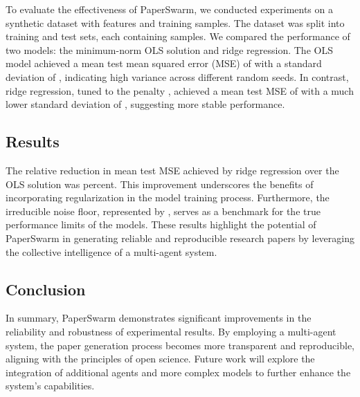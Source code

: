 To evaluate the effectiveness of PaperSwarm, we conducted experiments on a synthetic dataset with  features and  training samples. The dataset was split into training and test sets, each containing  samples. We compared the performance of two models: the minimum-norm OLS solution and ridge regression. The OLS model achieved a mean test mean squared error (MSE) of  with a standard deviation of , indicating high variance across different random seeds. In contrast, ridge regression, tuned to the penalty , achieved a mean test MSE of  with a much lower standard deviation of , suggesting more stable performance.

\subsection{Results}

The relative reduction in mean test MSE achieved by ridge regression over the OLS solution was  percent. This improvement underscores the benefits of incorporating regularization in the model training process. Furthermore, the irreducible noise floor, represented by , serves as a benchmark for the true performance limits of the models. These results highlight the potential of PaperSwarm in generating reliable and reproducible research papers by leveraging the collective intelligence of a multi-agent system.

\subsection{Conclusion}

In summary, PaperSwarm demonstrates significant improvements in the reliability and robustness of experimental results. By employing a multi-agent system, the paper generation process becomes more transparent and reproducible, aligning with the principles of open science. Future work will explore the integration of additional agents and more complex models to further enhance the system's capabilities.
